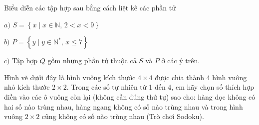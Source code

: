 \begin{bt}
	Biểu diễn các tập hợp sau bằng cách liệt kê các phần tử
	
	$a)$ $S=\left\{x \mid x \in \mathbb{N},\,2<x<9 \right\}$
	
	$b)$ $P=\left\{ y \mid y \in \mathbb{N^*},\, x\le 7 \right\}$
	
	$c)$ Tập hợp $Q$ gồm những phần tử thuộc cả $S$ và $P$ ở các ý trên.
\end{bt}
\begin{bt}
	Hình vẽ dưới đây là hình vuông kích thước $4\times 4$ được chia thành 4 hình vuông nhỏ kích thước $2\times 2$. Trong các số tự nhiên từ 1 đến 4, em hãy chọn số thích hợp điền vào các ô vuông còn lại (không cần đúng thứ tự) sao cho: hàng dọc không có hai số nào trùng nhau, hàng ngang không có số nào trùng nhau và trong hình vuông $2\times 2$ cũng không có số nào trùng nhau (Trò chơi Sodoku).
	\loigiai{
	}
\end{bt}
